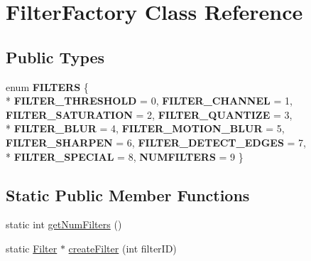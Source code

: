 \hypertarget{classFilterFactory}{\section{Filter\-Factory Class Reference}
\label{classFilterFactory}
}
\subsection*{Public Types}
\begin{DoxyCompactItemize}
\item 
enum {\bfseries F\-I\-L\-T\-E\-R\-S} \{ \\*
{\bfseries F\-I\-L\-T\-E\-R\-\_\-\-T\-H\-R\-E\-S\-H\-O\-L\-D} = 0, 
{\bfseries F\-I\-L\-T\-E\-R\-\_\-\-C\-H\-A\-N\-N\-E\-L} = 1, 
{\bfseries F\-I\-L\-T\-E\-R\-\_\-\-S\-A\-T\-U\-R\-A\-T\-I\-O\-N} = 2, 
{\bfseries F\-I\-L\-T\-E\-R\-\_\-\-Q\-U\-A\-N\-T\-I\-Z\-E} = 3, 
\\*
{\bfseries F\-I\-L\-T\-E\-R\-\_\-\-B\-L\-U\-R} = 4, 
{\bfseries F\-I\-L\-T\-E\-R\-\_\-\-M\-O\-T\-I\-O\-N\-\_\-\-B\-L\-U\-R} = 5, 
{\bfseries F\-I\-L\-T\-E\-R\-\_\-\-S\-H\-A\-R\-P\-E\-N} = 6, 
{\bfseries F\-I\-L\-T\-E\-R\-\_\-\-D\-E\-T\-E\-C\-T\-\_\-\-E\-D\-G\-E\-S} = 7, 
\\*
{\bfseries F\-I\-L\-T\-E\-R\-\_\-\-S\-P\-E\-C\-I\-A\-L} = 8, 
{\bfseries N\-U\-M\-F\-I\-L\-T\-E\-R\-S} = 9
 \}
\end{DoxyCompactItemize}
\subsection*{Static Public Member Functions}
\begin{DoxyCompactItemize}
\item 
static int \hyperlink{classFilterFactory_a978466237a3acfbd5570fbf1d4dc1080}{get\-Num\-Filters} ()
\item 
static \hyperlink{classFilter}{Filter} $\ast$ \hyperlink{classFilterFactory_afa9986fc11ea262c26febc9191a19f47}{create\-Filter} (int filter\-I\-D)
\end{DoxyCompactItemize}


